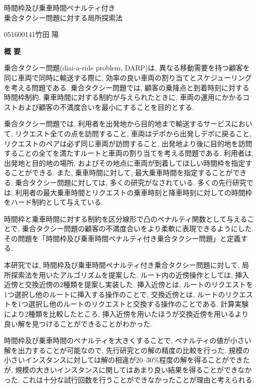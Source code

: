 \begin{center}
{\LARGE 時間枠及び乗車時間ペナルティ付き\\乗合タクシー問題に対する局所探索法}\\[0.5cm]
\end{center}
\hfill
{\large 051600141\qquad 竹田 陽}\\[0.5cm]
\begin{center}
{\Large \bf 概 要}\\
\end{center}


乗合タクシー問題(diai-a-ride problem, DARP)は, 異なる移動需要を持つ顧客を同じ車両で同時に輸送する際に, 効率の良い車両の割り当てとスケジューリングを考える問題である. 乗合タクシー問題では, 顧客の乗降点と到着時刻に対する時間枠制約, 乗車時間に対する制約が与えられたときに, 車両の運用にかかるコストおよび顧客の不満度合いを最小にすることを目的とする.

乗合タクシー問題では, 利用者を出発地から目的地まで輸送するサービスにおいて, リクエスト全ての点を訪問すること, 車両はデポから出発しデポに戻ること, リクエストのペアは必ず同じ車両が訪問すること, 出発地より後に目的地を訪問することの全てを満たすルートと車両の割り当てを考える問題である. 利用者は, 出発地と目的地の場所, およびその地点に車両が到着してほしい時間枠を指定することができる.
また, 乗車時間に対して, 最大乗車時間を指定することができる.
乗合タクシー問題に対しては, 多くの研究がなされている. 多くの先行研究では, 利用者の最大乗車時間とリクエストの乗車時刻と降車時刻に対しての時間枠をハード制約として与えている.

時間枠と乗車時間に対する制約を区分線形で凸のペナルティ関数として与えることで, 乗合タクシー問題の顧客の不満度合いをより柔軟に表現できるようにした. その問題を「時間枠及び乗車時間ペナルティ付き乗合タクシー問題」と定義する.

本研究では, 時間枠及び乗車時間ペナルティ付き乗合タクシー問題に対して, 局所探索法を用いたアルゴリズムを提案した.
ルート内の近傍操作としては, 挿入近傍と交換近傍の2種類を提案し実装した.
挿入近傍とは, ルートのリクエストを1つ選択し他のルートに挿入する操作のことで, 交換近傍とは, ルートのリクエストを1つ選択し他のルートのリクエストと交換する操作のことである.
計算実験により2種類を比較したところ, 挿入近傍を用いたほうが交換近傍を用いるより良い解を見つけることができることがわかった.

時間枠及び乗車時間のペナルティを大きくすることで, ペナルティの値が小さい解を出力することが可能なので, 先行研究との解の精度の比較を行った. 規模の小さいインスタンスに対しては解の相違が20--30\%程度の解を得ることができたが, 規模の大きいインスタンスに関してはあまり良い結果を得ることができなかった. これは十分な試行回数を行うことができなかったことが理由と考えられる.

